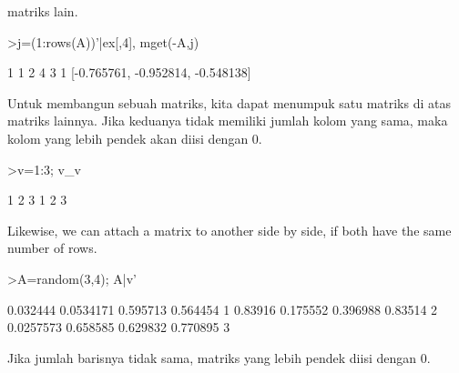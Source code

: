 \documentclass{article}
\begin{document}
\begin{eulernotebook}
\begin{eulercomment}
\begin{eulercomment}
\begin{eulercomment}
\begin{eulercomment}
\begin{eulercomment}
matriks lain.
\end{eulercomment}
\begin{eulerprompt}
>j=(1:rows(A))'|ex[,4], mget(-A,j)
\end{eulerprompt}
\begin{euleroutput}
              1             1 
              2             4 
              3             1 
  [-0.765761,  -0.952814,  -0.548138]
\end{euleroutput}
\begin{eulercomment}
\begin{eulercomment}
\begin{eulercomment}
Untuk membangun sebuah matriks, kita dapat menumpuk satu matriks di
atas matriks lainnya. Jika keduanya tidak memiliki jumlah kolom yang
sama, maka kolom yang lebih pendek akan diisi dengan 0.
\end{eulercomment}
\begin{eulerprompt}
>v=1:3; v_v
\end{eulerprompt}
\begin{euleroutput}
              1             2             3 
              1             2             3 
\end{euleroutput}
\begin{eulercomment}
Likewise, we can attach a matrix to another side by side, if both have
the same number of rows.
\end{eulercomment}
\begin{eulerprompt}
>A=random(3,4); A|v'
\end{eulerprompt}
\begin{euleroutput}
       0.032444     0.0534171      0.595713      0.564454             1 
        0.83916      0.175552      0.396988       0.83514             2 
      0.0257573      0.658585      0.629832      0.770895             3 
\end{euleroutput}
\begin{eulercomment}
Jika jumlah barisnya tidak sama, matriks yang lebih pendek diisi
dengan 0.


\end{eulercomment}
\end{eulercomment}
\end{eulercomment}
\end{eulercomment}
\end{eulercomment}
\end{eulercomment}
\end{eulercomment}
\end{eulernotebook}
\end{document}
